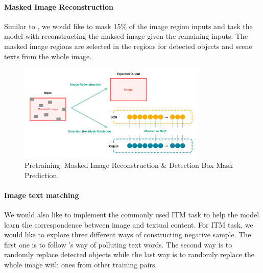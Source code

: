 \documentclass[11pt,a4paper]{article}
\begin{document}
\paragraph{Masked Image Reconstruction} Similar to \citet{lu2019vilbert}, we would like to mask 15\% of the image region inputs and task the model with reconstructing the maksed image given the remaining inputs. The masked image regions are selected in the regions for detected objects and scene texts from the whole image.
\begin{figure}[h]
\centering
  \includegraphics[width=0.8\textwidth]{figures/Pretraining_ImgRecon_DetectBoxMaskPred.pdf}
  \caption{Pretraining: Masked Image Reconstruction & Detection Box Mask Prediction.}
  \label{fig:pretraining_MIR}
\end{figure}

\paragraph{Image text matching} We would also like to implement the commonly used ITM task to help the model learn the correspondence between image and textual content. For ITM task, we would like to explore three different ways of constructing negative sample. The first one is to follow \citet{yang2021tap}'s way of polluting text words. The second way is to randomly replace detected objects while the last way is to randomly replace the whole image with ones from other training pairs.
\end{document}
